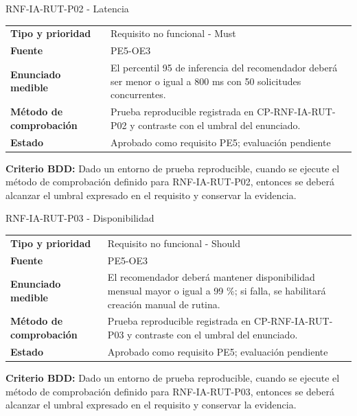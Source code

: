 \begin{reqbox}[colframe=Teal]{RNF-IA-RUT-P02 - Latencia}
\begin{tabularx}{\textwidth}{>{\bfseries}p{3.2cm}Y}
Tipo y prioridad & Requisito no funcional - Must \\
Fuente & PE5-OE3 \\
Enunciado medible & El percentil 95 de inferencia del recomendador deberá ser menor o igual a 800 ms con 50 solicitudes concurrentes. \\
Método de comprobación & Prueba reproducible registrada en CP-RNF-IA-RUT-P02 y contraste con el umbral del enunciado. \\
Estado & Aprobado como requisito PE5; evaluación pendiente \\
\end{tabularx}
\textbf{Criterio BDD:} Dado un entorno de prueba reproducible, cuando se ejecute el método de comprobación definido para RNF-IA-RUT-P02, entonces se deberá alcanzar el umbral expresado en el requisito y conservar la evidencia.
\end{reqbox}


\begin{reqbox}[colframe=Teal]{RNF-IA-RUT-P03 - Disponibilidad}
\begin{tabularx}{\textwidth}{>{\bfseries}p{3.2cm}Y}
Tipo y prioridad & Requisito no funcional - Should \\
Fuente & PE5-OE3 \\
Enunciado medible & El recomendador deberá mantener disponibilidad mensual mayor o igual a 99 \%; si falla, se habilitará creación manual de rutina. \\
Método de comprobación & Prueba reproducible registrada en CP-RNF-IA-RUT-P03 y contraste con el umbral del enunciado. \\
Estado & Aprobado como requisito PE5; evaluación pendiente \\
\end{tabularx}
\textbf{Criterio BDD:} Dado un entorno de prueba reproducible, cuando se ejecute el método de comprobación definido para RNF-IA-RUT-P03, entonces se deberá alcanzar el umbral expresado en el requisito y conservar la evidencia.
\end{reqbox}


